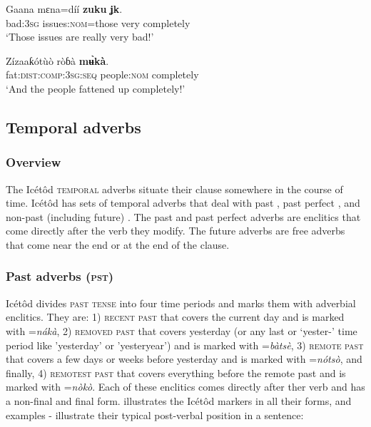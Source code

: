 \ea\label{ex:adv:1}
\gll Gaana   mɛna=díí     \textbf{zuku}   \textbf{ʝ{\Í}k\ᶤ}. \\
bad:\textsc{3sg}   issues:\textsc{nom}=those   very   completely    \\
\glt ‘Those issues are really very bad!’ 
\z




\ea\label{ex:adv:2}
\gll Zízaaƙótùò       ròɓà     \textbf{m\`{ʉ}kà}. \\
fat:\textsc{dist:comp:3sg:seq}   people:\textsc{nom}   completely    \\
\glt ‘And the people fattened up completely!’ 
\z






\subsection{Temporal adverbs}\label{sec:9.3}
\subsubsection{Overview}\label{sec:9.3.1}

The Icétôd \textsc{temporal} adverbs situate their clause somewhere in the course of time. Icétôd has sets of temporal adverbs that deal with past , past perfect , and non-past (including future) . The past and past perfect  adverbs are enclitics that come directly after the verb they modify. The future  adverbs are free adverbs that come near the end or at the end of the clause. 


\subsubsection{Past  adverbs (\textsc{pst})}\label{sec:9.3.2}

Icétôd divides \textsc{past tense} into four time periods and marks them with adverbial enclitics. They are: 1) \textsc{recent past} that covers the current day and is marked with =\textit{nákà}, 2) \textsc{removed past} that covers yesterday (or any last or ‘yester-’ time period like 'yesterday' or 'yesteryear') and is marked with =\textit{bàtsè}, 3) \textsc{remote past} that covers a few days or weeks before yesterday and is marked with =\textit{nótsò}, and finally, 4) \textsc{remotest past} that covers everything before the remote past and is marked with =\textit{nòkò}. Each of these  enclitics comes directly after ther verb and has a non-final and final form.  illustrates the Icétôd  markers in all their forms, and examples - illustrate their typical post-verbal position in a sentence:


